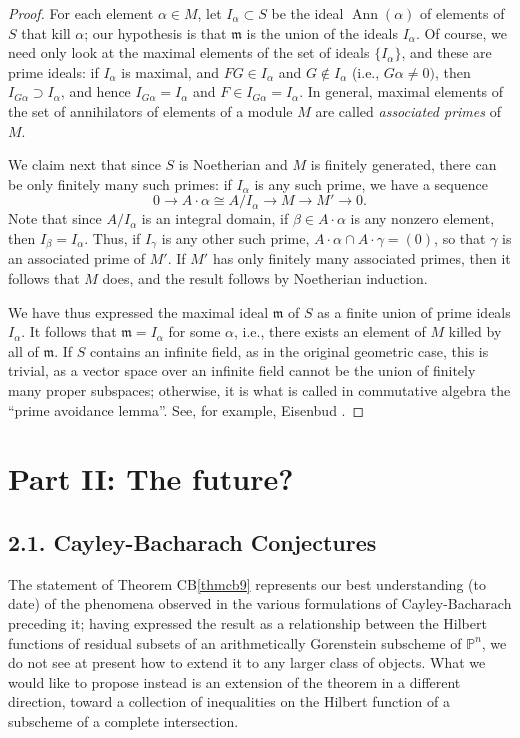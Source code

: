 \documentclass{bull-l}
\newcommand{\Ann}{\operatorname{Ann}}
\theoremstyle{pplain}
\theoremstyle{definition}
\begin{document}
\begin{proof} For each element $\alpha\in M$, let $I_\alpha\subset S$ be the
ideal $\Ann(\alpha)$ of elements of $S$ that kill $\alpha$; our hypothesis is
that $\mathfrak{m}$ is the union of the ideals $I_\alpha$.  Of course, we need
only look at the maximal elements of the set of ideals $\{I_\alpha\}$, and
these are prime ideals: if $I_\alpha$ is maximal, and $FG\in I_\alpha$ and
$G\notin I_\alpha$ (i.e., $G\alpha\ne 0)$, then $I_{G\alpha}\supset I_\alpha$,
and hence $I_{G\alpha}=I_\alpha$ and $F\in I_{G\alpha}=I_\alpha$.  In general,
maximal elements of the set of annihilators of elements of a module $M$ are
called \emph{associated primes} of $M$.

We claim next that since $S$ is Noetherian and $M$ is finitely generated, there
can be only finitely many such primes: if $I_\alpha$ is any such prime, we have
a sequence
\[0\to A\cdot \alpha\cong A/I_\alpha\to M\to M'\to 0.\]
Note that since $A/I_\alpha$ is an integral domain, if $\beta\in A\cdot \alpha$
is any nonzero element, then $I_\beta=I_\alpha$.  Thus, if $I_\gamma$ is any
other such prime, $A\cdot \alpha\cap A\cdot \gamma=(0)$, so that $\gamma$ is an
associated prime of $M'$.  If $M'$ has only finitely many associated primes,
then it follows that $M$ does, and the result follows by Noetherian induction.

We have thus expressed the maximal ideal $\mathfrak{m}$ of $S$ as a finite
union of prime ideals $I_\alpha$. It follows that $\mathfrak{m}=I_\alpha$ for
some $\alpha$, i.e., there exists an element of $M$ killed by all of
$\mathfrak{m}$.  If $S$ contains an infinite field, as in the original
geometric case, this is trivial, as a vector space over an infinite field
cannot be the union of finitely many proper subspaces; otherwise, it is
what is called in commutative algebra the ``prime avoidance lemma''.  See, for
example, Eisenbud \cite[section 3.2]{E}.
\end{proof}

\section*{Part II: The future?}
\subsection*{{\rm 2.1.} Cayley-Bacharach Conjectures}
The statement of Theorem CB\ref{thmcb9} represents our best understanding (to
date) of the phenomena observed in the various formulations of Cayley-Bacharach
preceding it; having expressed the result as a relationship between the Hilbert 
functions of residual subsets of an arithmetically Gorenstein subscheme of
$\mathbb{P}^n$, we do not see at present how to extend it to any larger class
of objects.  What we would like to propose instead is an extension of the 
theorem in a different direction, toward a collection of inequalities on the
Hilbert function of a subscheme of a complete intersection.
\end{document}
